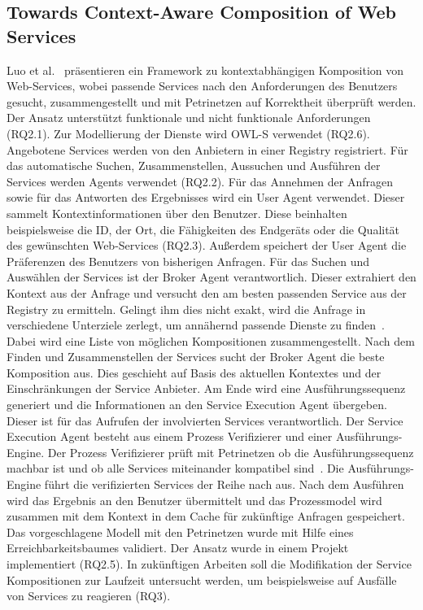 \documentclass[conference,compsoc]{IEEEtran}
\begin{document}
\subsection{Towards Context-Aware Composition of Web Services}
Luo et al.~\cite{luo2006towards} präsentieren ein Framework zu kontextabhängigen Komposition von Web-Services, wobei passende Services nach den Anforderungen des Benutzers gesucht, zusammengestellt und mit Petrinetzen auf Korrektheit überprüft werden. Der Ansatz unterstützt funktionale und nicht funktionale Anforderungen (RQ2.1). Zur Modellierung der Dienste wird OWL-S verwendet (RQ2.6). Angebotene Services werden von den Anbietern in einer Registry registriert. Für das automatische Suchen, Zusammenstellen, Aussuchen und Ausführen der Services werden Agents verwendet (RQ2.2).
Für das Annehmen der Anfragen sowie für das Antworten des Ergebnisses wird ein User Agent verwendet. Dieser sammelt Kontextinformationen über den Benutzer. Diese beinhalten beispielsweise die ID, der Ort, die Fähigkeiten des Endgeräts oder die Qualität des gewünschten Web-Services (RQ2.3). Außerdem speichert der User Agent die Präferenzen des Benutzers von bisherigen Anfragen.
Für das Suchen und Auswählen der Services ist der Broker Agent verantwortlich. Dieser extrahiert den Kontext aus der Anfrage und versucht den am besten passenden Service aus der Registry zu ermitteln. Gelingt ihm dies nicht exakt, wird die Anfrage in verschiedene Unterziele zerlegt, um annähernd passende Dienste zu finden~\cite{luo2006towards}. Dabei wird eine Liste von möglichen Kompositionen zusammengestellt. Nach dem Finden und Zusammenstellen der Services sucht der Broker Agent die beste Komposition aus. Dies geschieht auf Basis des aktuellen Kontextes und der Einschränkungen der Service Anbieter. Am Ende wird eine Ausführungssequenz generiert und die Informationen an den Service Execution Agent übergeben. Dieser ist für das Aufrufen der involvierten Services verantwortlich. Der Service Execution Agent besteht aus einem Prozess Verifizierer und einer Ausführungs-Engine. Der Prozess Verifizierer prüft mit Petrinetzen ob die Ausführungssequenz machbar ist und ob alle Services miteinander kompatibel sind~\cite{luo2006towards}. Die Ausführungs-Engine führt die verifizierten Services der Reihe nach aus. Nach dem Ausführen wird das Ergebnis an den Benutzer übermittelt und das Prozessmodel wird zusammen mit dem Kontext in dem Cache für zukünftige Anfragen gespeichert.
Das vorgeschlagene Modell mit den Petrinetzen wurde mit Hilfe eines Erreichbarkeitsbaumes validiert. Der Ansatz wurde in einem Projekt implementiert (RQ2.5). In zukünftigen Arbeiten soll die Modifikation der Service Kompositionen zur Laufzeit untersucht werden, um beispielsweise auf Ausfälle von Services zu reagieren (RQ3).
\end{document}
